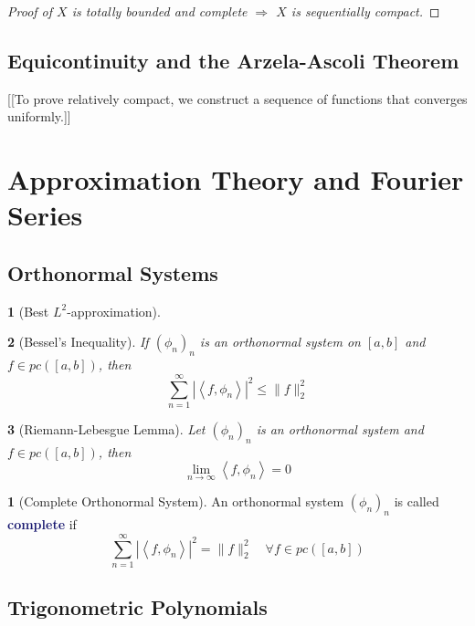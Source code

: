 \documentclass[11pt]{article}
\numberwithin{equation}{section}
\newcommand{\navy}[1]{\textcolor{MidnightBlue}{\bf #1}}
\theoremstyle{plain}
\newtheorem{theorem}{\color{ForestGreen}{\textbf{Theorem}}}[section]
\newtheorem{corollary}[theorem]{\color{ForestGreen}{\textbf{Corollary}}}
\theoremstyle{definition}
\newtheorem{definition}{\color{MidnightBlue}{\textbf{Definition}}}[section]
\newcommand\angles[1]{\left\langle #1 \right\rangle}
\newcommand\abs[1]{\left| #1 \right|}
\newcommand\norm[1]{\lVert#1\rVert}
\def\imp{\Rightarrow}
\newcommand{\1}{\mathbbm 1}
\begin{document}
\begin{proof}[Proof of $X$ is totally bounded and complete $\imp$ $X$ is sequentially compact]
\end{proof}

\subsection{Equicontinuity and the Arzela-Ascoli Theorem}

[[To prove relatively compact, we construct a sequence of functions that converges uniformly.]]

\newpage

\section{Approximation Theory and Fourier Series}

\subsection{Orthonormal Systems}

\begin{theorem}[Best $L^2$-approximation]
	
\end{theorem}


\begin{theorem}[Bessel's Inequality]
	If $(\phi_n)_n$ is an orthonormal system on $[a,b]$ and $f \in pc([a,b])$, then
	\begin{equation}
		\sum_{n=1}^\infty \abs{\angles{f,\phi_n}}^2 \leq \norm{f}^2_2
	\end{equation}
\end{theorem}

\begin{corollary}[Riemann-Lebesgue Lemma]
	Let $(\phi_n)_n$ is an orthonormal system and $f \in pc([a,b])$, then
	\begin{equation}
		\lim_{n\to\infty} \angles{f,\phi_n} = 0
	\end{equation}
\end{corollary}

\begin{definition}[Complete Orthonormal System]
	An orthonormal system $(\phi_n)_n$ is called \navy{complete} if 
	\begin{equation}
		\sum_{n=1}^\infty \abs{\angles{f,\phi_n}}^2 = \norm{f}^2_2 \quad \forall f \in pc([a,b])
	\end{equation}
\end{definition}


\subsection{Trigonometric Polynomials}
\end{document}
